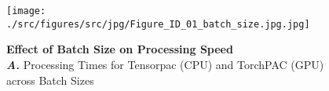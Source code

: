         \clearpage
        \begin{figure}[ht]
        	\centering
            \texttt{[image: ./src/figures/src/jpg/Figure\_ID\_01\_batch\_size.jpg.jpg]}


\caption{\textbf{
Effect of Batch Size on Processing Speed
}
\smallskip
\\
\textbf{\textit{A.}} Processing Times for Tensorpac (CPU) and TorchPAC (GPU) across Batch Sizes
}
        	\label{fig:01_batch_size}
        \end{figure}

